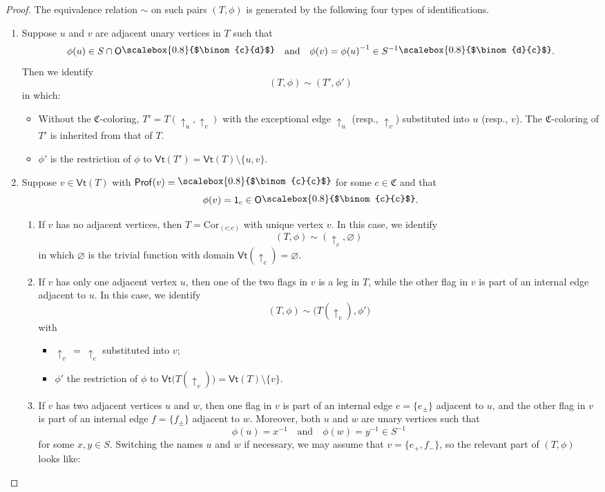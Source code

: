\documentclass[11pt]{amsbook}
\numberwithin{section}{chapter}
\numberwithin{subsection}{section}
\numberwithin{equation}{section}
\theoremstyle{plain}
\theoremstyle{definition}
\newcommand{\colorc}{\mathfrak{C}}
\newcommand{\Cor}{\mathrm{Cor}}
\newcommand{\Prof}{\mathsf{Prof}}
\newcommand{\profofv}{\Prof(v)}
\newcommand{\Vt}{\mathsf{Vt}}
\renewcommand{\O}{\mathsf{O}}
\newcommand{\operadunit}{\mathsf{1}}
\newcommand{\inv}[1]{{#1}^{-1}}
\newcommand{\Sinv}{\inv{S}}
\newcommand{\xinv}{\inv{x}}
\newcommand{\yinv}{\inv{y}}
\newcommand{\smallprof}[1]
{\raisebox{.05cm}{\scalebox{0.8}{#1}}}
\newcommand{\cc}{\smallprof{$\binom{c}{c}$}}
\newcommand{\cd}{\smallprof{$\binom{c}{d}$}}
\newcommand{\dc}{\smallprof{$\binom{d}{c}$}}
\newcommand{\andspace}{\quad\text{and}\quad}
\begin{document}
\begin{proof}
The equivalence relation $\sim$ on such pairs $(T,\phi)$ is generated by the following four types of identifications.
\begin{enumerate}
\item Suppose $u$ and $v$ are adjacent unary vertices in $T$ such that \[\phi(u) \in S\cap\O\cd \andspace \phi(v) = \inv{\phi(u)} \in \Sinv\dc.\]  Then we identify \[(T,\phi) \sim (T',\phi')\] in which:
\begin{itemize}\item Without the $\colorc$-coloring, $T'=T(\uparrow_u,\uparrow_v)$ with the exceptional edge $\uparrow_u$ (resp., $\uparrow_v$) substituted into $u$ (resp., $v$).  The $\colorc$-coloring of $T'$ is inherited from that of $T$.
\item $\phi'$ is the restriction of $\phi$ to $\Vt(T') = \Vt(T) \setminus \{u,v\}$.
\end{itemize}
\item Suppose $v \in \Vt(T)$ with $\profofv =\cc$ for some $c\in\colorc$ and that \[\phi(v)=\operadunit_c\in \O\cc.\]
\begin{enumerate}
\item If $v$ has no adjacent vertices, then $T=\Cor_{(c;c)}$ with unique vertex $v$.  In this case, we identify \[(T,\phi) \sim (\uparrow_c,\varnothing)\] in which $\varnothing$ is the trivial function with domain $\Vt(\uparrow_c)=\varnothing$.
\item If $v$ has only one adjacent vertex $u$, then one of the two flags in $v$ is a leg in $T$, while the other flag in $v$ is part of an internal edge adjacent to $u$.  In this case, we identify \[(T,\phi) \sim \bigl(T(\uparrow_v),\phi'\bigr)\] with 
\begin{itemize}\item $\uparrow_v\,=~\uparrow_c$ substituted into $v$;
\item $\phi'$ the restriction of $\phi$ to $\Vt\bigl(T(\uparrow_v)\bigr) = \Vt(T) \setminus\{v\}$.
\end{itemize}
\item If $v$ has two adjacent vertices $u$ and $w$, then one flag in $v$ is part of an internal edge $e=\{e_{\pm}\}$ adjacent to $u$, and the other flag in $v$ is part of an internal edge $f=\{f_{\pm}\}$ adjacent to $w$.  Moreover, both $u$ and $w$ are unary vertices such that \[\phi(u)=\xinv \andspace \phi(w)=\yinv \in \Sinv\] for some $x,y \in S$.  Switching the names $u$ and $w$ if necessary, we may assume that $v=\{e_+,f_-\}$, so the relevant part of $(T,\phi)$ looks like:
\begin{center}\begin{tikzpicture}

\end{tikzpicture}
\end{center}
\end{enumerate}
\end{enumerate}
\end{proof}
\end{document}
